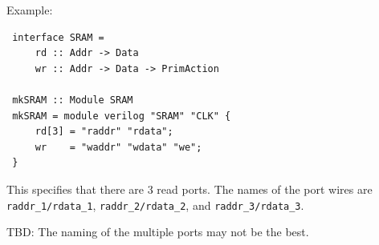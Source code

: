 \documentclass[twoside,letterpaper]{article}
\newcommand{\BH}{BH}
\newcommand\com[1]{}
\newcommand{\te}[1]{\texttt{#1}}
\newcommand{\tbd}[1]{{\sf TBD: #1}}
\begin{document}
Example:
\begin{verbatim}
 interface SRAM =
     rd :: Addr -> Data
     wr :: Addr -> Data -> PrimAction

 mkSRAM :: Module SRAM
 mkSRAM = module verilog "SRAM" "CLK" {
     rd[3] = "raddr" "rdata";
     wr    = "waddr" "wdata" "we";
 }
\end{verbatim}
This specifies that there are 3 read ports.  The names of the port
wires are \te{raddr\_1/rdata\_1}, \te{raddr\_2/rdata\_2}, and \te{raddr\_3/rdata\_3}.

\tbd{The naming of the multiple ports may not be the best.}

\com{
\subsubsection{Example: FIFO}

This example shows most of the features described above.  It is taken from
the definition of FIFOs as available in {\BH}.

Note how the \te{mkFIFO} function invokes two different implementations
of FIFOs depending on the size of the stored items (stored items
of size zero need no storage).

\begin{verbatim}
 interface FIFO a =
     enq      :: a -> Action
     deq      :: Action
     first    :: a
     clear    :: Action

 interface FIFO_ n =
     enq_      :: Bit n -> PrimAction
     deq_      :: Action
     first_    :: Bit n
     notFull_  :: Bit 1
     notEmpty_ :: Bit 1
     clear_    :: Action


 -- Note, n>0 must hold.
 vMkFIFO :: Module (FIFO_ n)
 vMkFIFO =
   module verilog "FIFON" (valueOf n) "CLK" {
     enq_      = "idata" "ENQ";
     deq_      = "DEQ";
     first_    = "odata";
     notFull_  = "CANENQ";
     notEmpty_ = "CANDEQ";
     clear_    = "CLR";
   }   [ enq_ <> [deq_, first_, notFull_, notEmpty_],
         deq_ <> [enq_, first_, notFull_, notEmpty_]
       ]

 mkFIFO :: (Bits a as) => Module (FIFO a)
 mkFIFO =
   -- Use a counter if the enqueued item has size 0
   if valueOf as == 0 then
     module
       _n :: Reg (Bit 1)
       _n <- mkReg 0
       interface
         enq _ = _n := _n + 1                  when _n < maxBound
         deq   = _n := _n - 1                  when _n > 0
         first = unpack 0                      when _n > 0
         clear = _n := 0
   else
     -- Use a Verilog FIFO for ordinary items
     module
       _f :: FIFO_ as
       _f <- vMkFIFO
       interface
         enq x    = _f.enq_ (pack x)           when (unpack _f.notFull_)
         deq      = _f.deq_                    when (unpack _f.notEmpty_)
         first    = unpack _f.first_           when (unpack _f.notEmpty_)
         clear    = _f.clear_
\end{verbatim}

}
\end{document}
